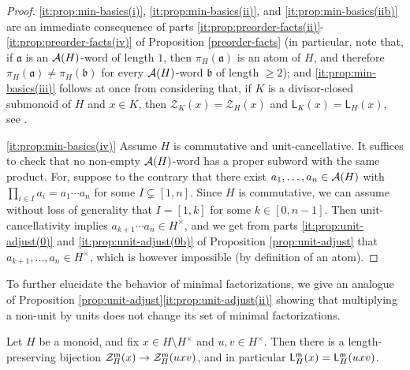 %
\begin{proof}
	\ref{it:prop:min-basics(i)}, \ref{it:prop:min-basics(ii)}, and \ref{it:prop:min-basics(iib)} are an immediate consequence of parts \ref{it:prop:preorder-facts(ii)}-\ref{it:prop:preorder-facts(iv)} of Proposition \ref{preorder-facts} (in particular, note that, if $\mathfrak a$  is an $\mathcal{A}(H)$-word of length $1$, then $\pi_H(\mathfrak a)$ is an atom of $H$, and therefore $\pi_H(\mathfrak a) \ne \pi_H(\mathfrak b)$ for every  $\mathcal{A}(H)$-word $\mathfrak b$ of length $\ge 2$); and \ref{it:prop:min-basics(iii)} follows at once from considering that, if $K$ is a divisor-closed submonoid of $H$ and $x \in K$, then $\mathcal Z_K(x) = \mathcal Z_H(x)$ and $\mathsf L_K(x) = \mathsf L_H(x)$, see \cite[Proposition 2.21(ii)]{fan-tringali18}.
	
	\ref{it:prop:min-basics(iv)} Assume $H$ is commutative and unit-cancellative. It suffices to check that no non-empty $\mathcal{A}(H)$-word has a proper subword with the same product.
	For, suppose to the contrary that there exist  $a_1,\dots,a_n \in \mathcal{A}(H)$ with $\prod_{i \in I} a_i = a_1\cdots a_n$ for some $I \subsetneq [ 1, n ]$. Since $H$ is commutative, we can assume without loss of generality that $I = [ 1, k ]$ for some $k \in [ 0, n-1 ]$. Then unit-cancellativity implies $a_{k+1}\cdots a_n \in H^\times$, and we get from parts \ref{it:prop:unit-adjust(0)} and \ref{it:prop:unit-adjust(0b)} of Proposition \ref{prop:unit-adjust} that $a_{k+1},\dots,a_n \in H^\times$, which is however impossible (by definition of an atom).	
%	
\end{proof}
%
To further elucidate the behavior of minimal factorizations, we give an analogue of Proposition \ref{prop:unit-adjust}\ref{it:prop:unit-adjust(ii)} showing that multiplying a non-unit by units does not change its set of minimal factorizations.
%
\begin{lemma}\label{lem:min-unit-adjust}
	Let $H$ be a monoid, and fix $x\in H\setminus H^\times$ and $u,v\in H^\times$.
	Then there is a length-preserving bijection $\mathcal{Z}_H^{\mathsf{m}}(x)\to\mathcal{Z}_H^{\mathsf{m}}(uxv)$, and in particular $\mathsf L_H^{\mathsf{m}}(x) = \mathsf L_H^{\mathsf{m}}(uxv)$.
\end{lemma}
